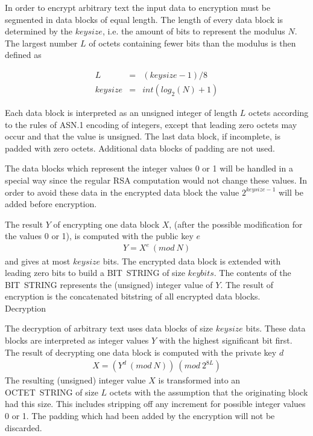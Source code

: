 In order to encrypt arbitrary text the input data to encryption must be
segmented in data blocks of equal length.  The length of every data
block is determined by the $keysize$, i.e. the amount of bits to
represent the modulus $N$.  The largest number $L$ of octets containing
fewer bits than the modulus is then defined as

\begin{eqnarray*}
	L	& = & (keysize-1)/8 \\
	keysize & = & int ( log_2 (N) + 1 )
\end{eqnarray*}

Each data block is interpreted as an unsigned integer of length $L$ octets
according to the rules of ASN.1 encoding of integers, except that leading
zero octets may occur and that the value is unsigned.
The last data block, if incomplete, is padded with zero octets.
Additional data blocks of padding are not used.

The data blocks which represent the integer values 0 or 1 will be handled 
in
a special way since the regular RSA computation would not change these 
values.
In order to avoid these data in the encrypted data block the value
$2^{keysize-1}$ will be added before encryption.

The result $Y$ of encrypting one data block $X$, (after the possible 
modification for
the values 0 or 1), is computed with the public key $e$
\begin{eqnarray*}
	Y = X^e ~(mod ~N)
\end{eqnarray*}
\noindent
and gives at most $keysize$ bits. The encrypted data block is extended
with leading zero bits to build a BIT~STRING of size $keybits$. The 
contents
of the BIT~STRING represents the (unsigned) integer value of $Y$.
The result of encryption is the concatenated bitstring of all encrypted 
data
blocks.
\\ [1em]
Decryption

The decryption of arbitrary text uses data blocks of size $keysize$ bits.
These data blocks are interpreted as integer values $Y$ with the highest
significant bit first.
The result of decrypting one data block is computed with the private key 
$d$
\begin{eqnarray*}
	X = (Y^d ~(mod ~N)) ~(mod ~2^{8L})
\end{eqnarray*}
\noindent
The resulting (unsigned) integer value $X$ is transformed into an 
OCTET~STRING
of size $L$ octets with the assumption that the originating
block had this size.  This includes stripping off any increment for
possible integer values 0 or 1.  The padding which had been added by
the encryption will not be discarded.


